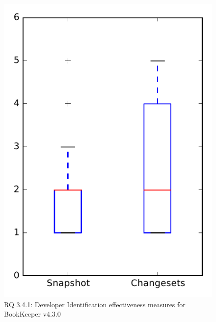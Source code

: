 
\begin{figure}
\centering
\includegraphics[height=0.4\textheight]{figures/dit_seed/rq1_bookkeeper}
\caption{RQ 3.4.1: Developer Identification effectiveness measures for BookKeeper v4.3.0}
\label{fig:dit_seed:rq1:bookkeeper}
\end{figure}
